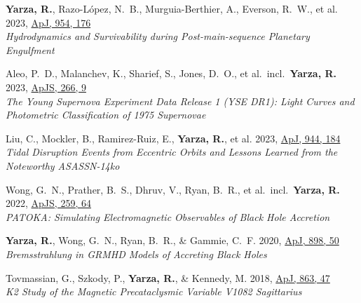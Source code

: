 \item \textbf{Yarza, R.}, Razo-López, N.~B., Murguia-Berthier, A., Everson, R.~W., et al. 2023, \href{https://ui.adsabs.harvard.edu/abs/2023ApJ...954..176Y}{ApJ, 954, 176}\\\textit{Hydrodynamics and Survivability during Post-main-sequence Planetary Engulfment}

\item Aleo, P.~D., Malanchev, K., Sharief, S., Jones, D.~O., et al.\ incl.\ \textbf{Yarza, R.} 2023, \href{https://ui.adsabs.harvard.edu/abs/2023ApJS..266....9A}{ApJS, 266, 9}\\\textit{The Young Supernova Experiment Data Release 1 (YSE DR1): Light Curves and Photometric Classification of 1975 Supernovae}

\item Liu, C., Mockler, B., Ramirez-Ruiz, E., \textbf{Yarza, R.}, et al. 2023, \href{https://ui.adsabs.harvard.edu/abs/2023ApJ...944..184L}{ApJ, 944, 184}\\\textit{Tidal Disruption Events from Eccentric Orbits and Lessons Learned from the Noteworthy ASASSN-14ko}

\item Wong, G.~N., Prather, B.~S., Dhruv, V., Ryan, B.~R., et al.\ incl.\ \textbf{Yarza, R.} 2022, \href{https://ui.adsabs.harvard.edu/abs/2022ApJS..259...64W}{ApJS, 259, 64}\\\textit{PATOKA\@: Simulating Electromagnetic Observables of Black Hole Accretion}

\item \textbf{Yarza, R.}, Wong, G.~N., Ryan, B.~R., \& Gammie, C.~F. 2020, \href{https://ui.adsabs.harvard.edu/abs/2020ApJ...898...50Y}{ApJ, 898, 50}\\\textit{Bremsstrahlung in GRMHD Models of Accreting Black Holes}

\item Tovmassian, G., Szkody, P., \textbf{Yarza, R.}, \& Kennedy, M. 2018, \href{https://ui.adsabs.harvard.edu/abs/2018ApJ...863...47T}{ApJ, 863, 47}\\\textit{K2 Study of the Magnetic Precataclysmic Variable V1082 Sagittarius}

